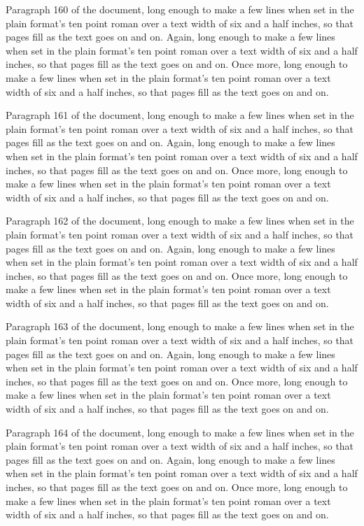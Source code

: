 Paragraph 160 of the document, long enough to make a few lines when set in the plain format's ten point roman over a text width of six and a half inches, so that pages fill as the text goes on and on. Again, long enough to make a few lines when set in the plain format's ten point roman over a text width of six and a half inches, so that pages fill as the text goes on and on. Once more, long enough to make a few lines when set in the plain format's ten point roman over a text width of six and a half inches, so that pages fill as the text goes on and on.

Paragraph 161 of the document, long enough to make a few lines when set in the plain format's ten point roman over a text width of six and a half inches, so that pages fill as the text goes on and on. Again, long enough to make a few lines when set in the plain format's ten point roman over a text width of six and a half inches, so that pages fill as the text goes on and on. Once more, long enough to make a few lines when set in the plain format's ten point roman over a text width of six and a half inches, so that pages fill as the text goes on and on.

Paragraph 162 of the document, long enough to make a few lines when set in the plain format's ten point roman over a text width of six and a half inches, so that pages fill as the text goes on and on. Again, long enough to make a few lines when set in the plain format's ten point roman over a text width of six and a half inches, so that pages fill as the text goes on and on. Once more, long enough to make a few lines when set in the plain format's ten point roman over a text width of six and a half inches, so that pages fill as the text goes on and on.

Paragraph 163 of the document, long enough to make a few lines when set in the plain format's ten point roman over a text width of six and a half inches, so that pages fill as the text goes on and on. Again, long enough to make a few lines when set in the plain format's ten point roman over a text width of six and a half inches, so that pages fill as the text goes on and on. Once more, long enough to make a few lines when set in the plain format's ten point roman over a text width of six and a half inches, so that pages fill as the text goes on and on.

Paragraph 164 of the document, long enough to make a few lines when set in the plain format's ten point roman over a text width of six and a half inches, so that pages fill as the text goes on and on. Again, long enough to make a few lines when set in the plain format's ten point roman over a text width of six and a half inches, so that pages fill as the text goes on and on. Once more, long enough to make a few lines when set in the plain format's ten point roman over a text width of six and a half inches, so that pages fill as the text goes on and on.

